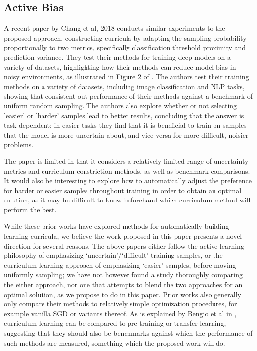 \documentclass[a4paper,10.5pt]{article}
\begin{document}
\subsection*{Active Bias}
A recent paper by Chang et al, 2018 \cite{Chang 18} conducts similar experiments to the proposed approach, constructing curricula by adapting the sampling probability proportionally to two metrics, specifically classification threshold proximity and prediction variance. They test their methods for training deep models on a variety of datasets, highlighting how their methods can reduce model bias in noisy environments, as illustrated in Figure 2 of \cite{Chang 18}. The authors test their training methods on a variety of datasets, including image classification and NLP tasks, showing that consistent out-performance of their methods against a benchmark of uniform random sampling. The authors also explore whether or not selecting 'easier' or 'harder' samples lead to better results, concluding that the answer is task dependent; in easier tasks they find that it is beneficial to train on samples that the model is more uncertain about, and vice versa for more difficult, noisier problems. 

The paper is limited in that it considers a relatively limited range of uncertainty metrics and curriculum constriction methods, as well as benchmark comparisons. It would also be interesting to explore how to automatically adjust the preference for harder or easier samples throughout training in order to obtain an optimal solution, as it may be difficult to know beforehand which curriculum method will perform the best. 
\vspace{0.5cm}

While these prior works have explored methods for automatically building learning curricula, we believe the work proposed in this paper presents a novel direction for several reasons. The above papers either follow the active learning philosophy of emphasizing `uncertain'/`difficult' training samples, or the curriculum learning approach of emphasizing `easier' samples, before moving uniformly sampling; we have not however found a study thoroughly comparing the either approach, nor one that attempts to blend the two approaches for an optimal solution, as we propose to do in this paper. Prior works also generally only compare their methods to relatively simple optimization procedures, for example vanilla SGD or variants thereof. As is explained by Bengio et al in \cite{Bengio 09}, curriculum learning can be compared to pre-training or transfer learning, suggesting that they should also be benchmarks against which the performance of such methods are measured, something which the proposed work will do. 
\end{document}

